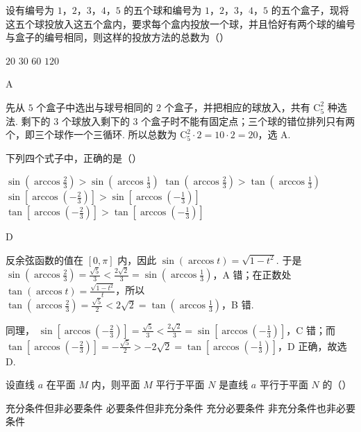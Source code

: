 \documentclass[UTF8,a4paper,oneside,11pt]{ctexbook}
\begin{document}
\begin{problem}
设有编号为 \(1\)，\(2\)，\(3\)，\(4\)，\(5\) 的五个球和编号为 \(1\)，\(2\)，\(3\)，\(4\)，\(5\) 的五个盒子，现将这五个球投放入这五个盒内，要求每个盒内投放一个球，并且恰好有两个球的编号与盒子的编号相同，则这样的投放方法的总数为（\quad）

\choices
    {\(20\)}
    {\(30\)}
    {\(60\)}
    {\(120\)}
\end{problem}

\begin{answer}
A
\end{answer}

\begin{solution}
先从 \(5\) 个盒子中选出与球号相同的 \(2\) 个盒子，并把相应的球放入，共有 \(\mathrm C_5^2\) 种选法. 剩下的 \(3\) 个球放入剩下的 \(3\) 个盒子时不能有固定点；三个球的错位排列只有两个，即三个球作一个三循环. 所以总数为
\(\mathrm C_5^2\cdot2=10\cdot2=20\)，选 A.
\end{solution}

\begin{problem}
下列四个式子中，正确的是（\quad）

\choices
    {\(\sin\left(\arccos \frac{2}{3}\right) > \sin\left(\arccos \frac{1}{3}\right)\)}
    {\(\tan\left(\arccos \frac{2}{3}\right) > \tan\left(\arccos \frac{1}{3}\right)\)}
    {\(\sin\left[\arccos\left(-\frac{2}{3}\right)\right] > \sin\left[\arccos\left(-\frac{1}{3}\right)\right]\)}
    {\(\tan\left[\arccos\left(-\frac{2}{3}\right)\right] > \tan\left[\arccos\left(-\frac{1}{3}\right)\right]\)}
\end{problem}

\begin{answer}
D
\end{answer}

\begin{solution}
反余弦函数的值在 \([0,\pi]\) 内，因此
\(\sin(\arccos t)=\sqrt{1-t^2}\). 于是
\(\sin(\arccos\frac23)=\frac{\sqrt5}{3}<\frac{2\sqrt2}{3}=\sin(\arccos\frac13)\)，A 错；在正数处
\(\tan(\arccos t)=\frac{\sqrt{1-t^2}}{t}\)，所以
\(\tan(\arccos\frac23)=\frac{\sqrt5}{2}<2\sqrt2=\tan(\arccos\frac13)\)，B 错.

同理，
\(\sin[\arccos(-\frac23)]=\frac{\sqrt5}{3}<\frac{2\sqrt2}{3}=\sin[\arccos(-\frac13)]\)，C 错；而
\(\tan[\arccos(-\frac23)]=-\frac{\sqrt5}{2}>-2\sqrt2=\tan[\arccos(-\frac13)]\)，D 正确，故选 D.
\end{solution}

\begin{problem}
设直线 \(a\) 在平面 \(M\) 内，则平面 \(M\) 平行于平面 \(N\) 是直线 \(a\) 平行于平面 \(N\) 的（\quad）

\choices
    {充分条件但非必要条件}
    {必要条件但非充分条件}
    {充分必要条件}
    {非充分条件也非必要条件}
\end{problem}
\end{document}
